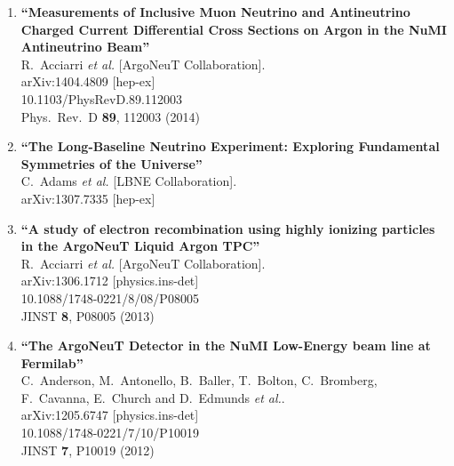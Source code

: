 \documentclass{res}
\begin{document}
\begin{resume}
\begin{enumerate}
\item%
{\bf ``Measurements of Inclusive Muon Neutrino and Antineutrino Charged Current Differential Cross Sections on Argon in the NuMI Antineutrino Beam''}
  \\{}R.~Acciarri {\it et al.}  [ArgoNeuT Collaboration].
  \\{}arXiv:1404.4809 [hep-ex]
    \\{}10.1103/PhysRevD.89.112003
\\{}Phys.\ Rev.\ D {\bf 89}, 112003 (2014) %


\item%
{\bf ``The Long-Baseline Neutrino Experiment: Exploring Fundamental Symmetries of the Universe''}
  \\{}C.~Adams {\it et al.}  [LBNE Collaboration].
  \\{}arXiv:1307.7335 [hep-ex]
  


\item%
{\bf ``A study of electron recombination using highly ionizing particles in the ArgoNeuT Liquid Argon TPC''}
  \\{}R.~Acciarri {\it et al.}  [ArgoNeuT Collaboration].
  \\{}arXiv:1306.1712 [physics.ins-det]
    \\{}10.1088/1748-0221/8/08/P08005
\\{}JINST {\bf 8}, P08005 (2013) %


\item%
{\bf ``The ArgoNeuT Detector in the NuMI Low-Energy beam line at Fermilab''}
  \\{}C.~Anderson, M.~Antonello, B.~Baller, T.~Bolton, C.~Bromberg, F.~Cavanna, E.~Church and D.~Edmunds {\it et al.}.
  \\{}arXiv:1205.6747 [physics.ins-det]
    \\{}10.1088/1748-0221/7/10/P10019
\\{}JINST {\bf 7}, P10019 (2012) %



\end{enumerate}
\end{resume}
\end{document}
